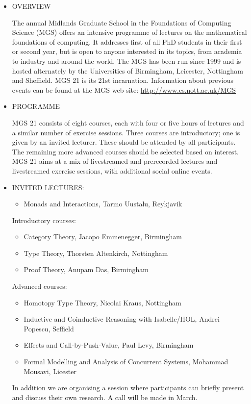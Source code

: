 \documentclass{article}
\begin{document}
\begin{itemize}\item  OVERVIEW  
 
  The annual Midlands Graduate School in the Foundations of Computing Science (MGS) offers an intensive programme of lectures on the mathematical foundations of computing. It addresses first of all PhD students in their first or second year, but is open to anyone interested in its topics, from academia to industry and around the world. The MGS has been run since 1999 and is hosted alternately by the Universities of Birmingham, Leicester, Nottingham and Sheffield. MGS 21 is its 21st incarnation. Information about previous events can be found at the MGS web site: \href{http://www.cs.nott.ac.uk/MGS}{http://www.cs.nott.ac.uk/MGS} 
 
\item  PROGRAMME  
 
  MGS 21 consists of eight courses, each with four or five hours of lectures and a similar number of exercise sessions. Three courses are introductory; one is given by an invited lecturer. These should be attended by all participants. The remaining more advanced courses should be selected based on interest. MGS 21 aims at a mix of livestreamed and prerecorded lectures and livestreamed exercise sessions, with additional social online events. 
 
\item  INVITED LECTURES:  
 
\begin{itemize}\item  Monads and Interactions, Tarmo Uustalu, Reykjavik
\end{itemize} 
  Introductory courses: 
 
\begin{itemize}\item  Category Theory, Jacopo Emmenegger, Birmingham
\item  Type Theory, Thorsten Altenkirch, Nottingham
\item  Proof Theory, Anupam Das, Birmingham
\end{itemize} 
  Advanced courses: 
 
\begin{itemize}\item  Homotopy Type Theory, Nicolai Kraus, Nottingham
\item  Inductive and Coinductive Reasoning with Isabelle/HOL, Andrei Popescu, Seffield
\item  Effects and Call-by-Push-Value, Paul Levy, Birmingham
\item  Formal Modelling and Analysis of Concurrent Systems, Mohammad Mousavi, Licester
\end{itemize} 
  In addition we are organising a session where participants can briefly present and discuss their own research. A call will be made in March. 
 

\end{itemize}
\end{document}
